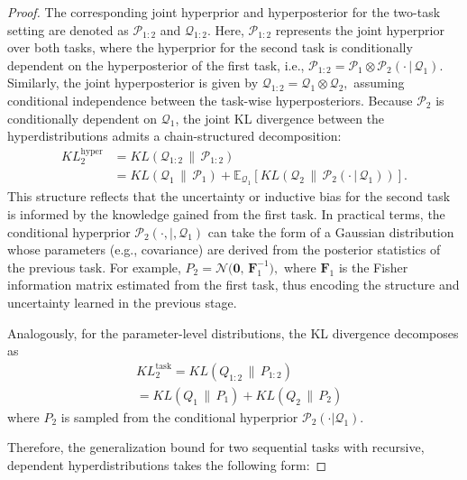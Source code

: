 \documentclass[letterpaper]{article} %
\begin{document}
\begin{proof}
The corresponding joint hyperprior and hyperposterior for the two-task setting are denoted as $\mathcal{P}_{1:2}$ and $\mathcal{Q}_{1:2}$. Here, $\mathcal{P}_{1:2}$ represents the joint hyperprior over both tasks, where the hyperprior for the second task is conditionally dependent on the hyperposterior of the first task, i.e.,
$\mathcal{P}_{1:2} = \mathcal{P}_1 \otimes \mathcal{P}_2(\cdot\,|\,\mathcal{Q}_1).$
Similarly, the joint hyperposterior is given by
$\mathcal{Q}_{1:2} = \mathcal{Q}_1 \otimes \mathcal{Q}_2,$
assuming conditional independence between the task-wise hyperposteriors. Because $\mathcal{P}_2$ is conditionally dependent on $\mathcal{Q}_1$, the joint KL divergence between the hyperdistributions admits a chain-structured decomposition:
\begin{equation}
\begin{aligned}
    KL^{\text{hyper}}_2&=KL(\mathcal{Q}_{1:2}\,\|\,\mathcal{P}_{1:2})  \\
    &= KL(\mathcal{Q}_1\,\|\,\mathcal{P}_1) + \mathbb{E}_{\mathcal{Q}_1}\left[ KL(\mathcal{Q}_2\,\|\,\mathcal{P}_2(\cdot\,|\,\mathcal{Q}_1)) \right].
\end{aligned}
\end{equation}
This structure reflects that the uncertainty or inductive bias for the second task is informed by the knowledge gained from the first task. In practical terms, the conditional hyperprior $\mathcal{P}_2(\cdot,|,\mathcal{Q}_1)$ can take the form of a Gaussian distribution whose parameters (e.g., covariance) are derived from the posterior statistics of the previous task. For example,
$P_2 = \mathcal{N}\big(\mathbf{0},\, \mathbf{F}_1^{-1}\big),$
where $\mathbf{F}_1$ is the Fisher information matrix estimated from the first task, thus encoding the structure and uncertainty learned in the previous stage.


Analogously, for the parameter-level distributions, the KL divergence decomposes as
\begin{align*}
 &KL^{\text{task}}_2 =KL(Q_{1:2}\,\|\,P_{1:2})  \\
 &   = KL(Q_1\,\|\,P_1) + KL(Q_2\,\|\,P_2)
\end{align*}
where $P_2$ is sampled from the conditional hyperprior $\mathcal{P}_2(\cdot|\mathcal{Q}_1)$.



Therefore, the generalization bound for two sequential tasks with recursive, dependent hyperdistributions takes the following form:



\end{proof}
\end{document}
